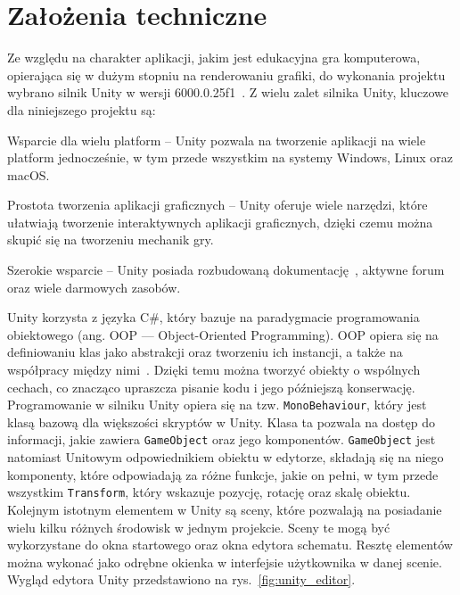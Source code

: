 \section{Założenia techniczne}
\label{sec:zalozenia_techniczne}

Ze względu na charakter aplikacji, jakim jest edukacyjna gra komputerowa,
opierająca się w dużym stopniu na renderowaniu grafiki,
do wykonania projektu wybrano silnik Unity w wersji 6000.0.25f1~\cite{unity_site}.
Z wielu zalet silnika Unity, kluczowe dla niniejszego projektu są:

\begin{citemize}
    \item Wsparcie dla wielu platform --
    Unity pozwala na tworzenie aplikacji na wiele platform jednocześnie, w tym przede wszystkim na systemy Windows, Linux oraz macOS.
    \item Prostota tworzenia aplikacji graficznych --
    Unity oferuje wiele narzędzi, które ułatwiają tworzenie interaktywnych aplikacji graficznych,
    dzięki czemu można skupić się na tworzeniu mechanik gry.
    \item Szerokie wsparcie --
    Unity posiada rozbudowaną dokumentację~\cite{unity_docs},
    aktywne forum~\cite{unity_forum} oraz wiele darmowych zasobów.
\end{citemize}

Unity korzysta z języka C\#,
który bazuje na paradygmacie programowania obiektowego (ang. OOP — Object-Oriented Programming).
OOP opiera się na definiowaniu klas jako abstrakcji oraz tworzeniu ich instancji,
a także na współpracy między nimi~\cite{nygaard1986basic}.
Dzięki temu można tworzyć obiekty o wspólnych cechach,
co znacząco upraszcza pisanie kodu i jego późniejszą konserwację.\\
\indent Programowanie w silniku Unity opiera się na tzw. \texttt{MonoBehaviour},
który jest klasą bazową dla większości skryptów w Unity.
Klasa ta pozwala na dostęp do informacji, jakie zawiera \texttt{GameObject} oraz jego komponentów.
\texttt{GameObject} jest natomiast Unitowym odpowiednikiem obiektu w edytorze,
składają się na niego komponenty, które odpowiadają za różne funkcje, jakie on pełni,
w tym przede wszystkim \texttt{Transform}, który wskazuje pozycję, rotację oraz skalę obiektu.\\
\indent Kolejnym istotnym elementem w Unity są sceny,
które pozwalają na posiadanie wielu kilku różnych środowisk w jednym projekcie.
Sceny te mogą być wykorzystane do okna startowego oraz okna edytora schematu.
Resztę elementów można wykonać jako odrębne okienka w interfejsie użytkownika w danej scenie.
Wygląd edytora Unity przedstawiono na rys.~\ref{fig:unity_editor}.


